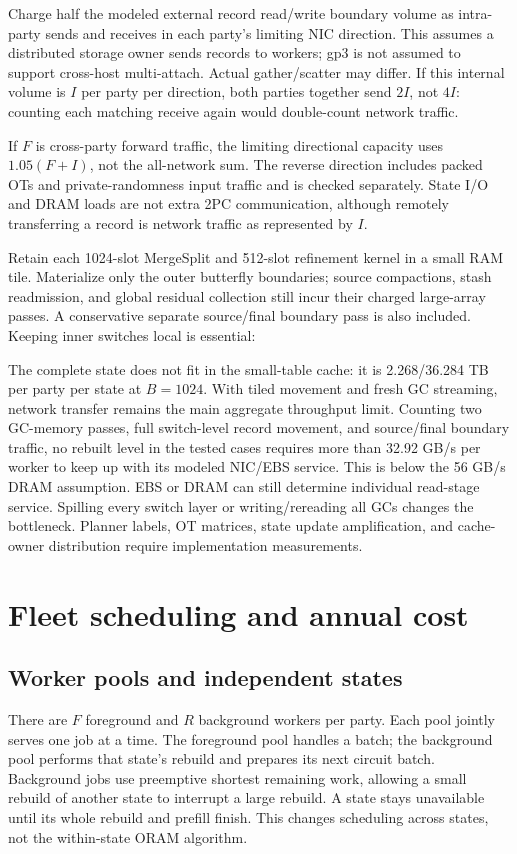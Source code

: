 \documentclass[11pt]{article}
\begin{document}
Charge half the modeled external record read/write boundary volume as
intra-party sends and receives in each party's limiting NIC direction.
This assumes a distributed storage owner sends records to workers; gp3
is not assumed to support cross-host multi-attach. Actual gather/scatter
may differ. If this internal volume is $I$ per party per direction, both
parties together send $2I$, not $4I$: counting each matching receive again
would double-count network traffic.


If $F$ is cross-party forward traffic, the limiting directional capacity
uses $1.05(F+I)$, not the all-network sum. The reverse direction includes
packed OTs and private-randomness input traffic and is checked separately.
State I/O and DRAM loads are not extra 2PC communication, although remotely
transferring a record is network traffic as represented by $I$.


Retain each 1024-slot MergeSplit and 512-slot refinement kernel in a small
RAM tile. Materialize only the outer butterfly boundaries; source
compactions, stash readmission, and global residual collection still incur
their charged large-array passes. A conservative separate source/final
boundary pass is also included. Keeping inner switches local is essential:


The complete state does not fit in the small-table cache: it is
2.268/36.284 TB per party per state at $B=1024$. With tiled movement and
fresh GC streaming, network transfer remains the main aggregate throughput
limit. Counting two GC-memory passes, full switch-level record movement,
and source/final boundary traffic, no rebuilt level in the tested cases
requires more than 32.92 GB/s per worker to keep up with its modeled
NIC/EBS service. This is below the 56 GB/s DRAM assumption. EBS or DRAM
can still determine individual read-stage service.
Spilling every switch layer or writing/rereading all GCs changes the
bottleneck. Planner labels, OT matrices, state update amplification, and
cache-owner distribution require implementation measurements.

\section{Fleet scheduling and annual cost}
\subsection{Worker pools and independent states}
There are $F$ foreground and $R$ background workers per party. Each pool
jointly serves one job at a time. The foreground pool handles a batch;
the background pool performs that state's rebuild and prepares its next
circuit batch. Background jobs use preemptive shortest remaining work,
allowing a small rebuild of another state to interrupt a large rebuild.
A state stays unavailable until its whole rebuild and prefill finish.
This changes scheduling across states, not the within-state ORAM algorithm.
\end{document}
